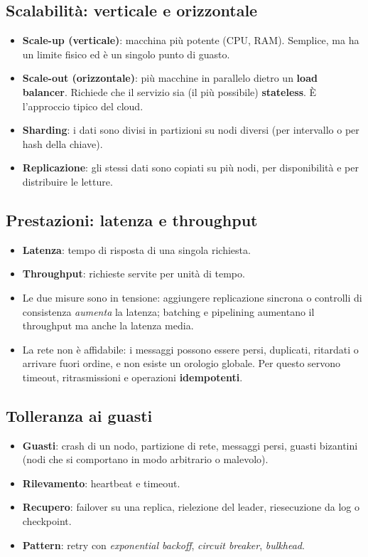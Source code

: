 \subsection{Scalabilità: verticale e orizzontale}
\begin{itemize}
    \item \textbf{Scale-up (verticale)}: macchina più potente (CPU, RAM). Semplice, ma ha un limite fisico ed è un singolo punto di guasto.
    \item \textbf{Scale-out (orizzontale)}: più macchine in parallelo dietro un \textbf{load balancer}. Richiede che il servizio sia (il più possibile) \textbf{stateless}. È l'approccio tipico del cloud.
    \item \textbf{Sharding}: i dati sono divisi in partizioni su nodi diversi (per intervallo o per hash della chiave).
    \item \textbf{Replicazione}: gli stessi dati sono copiati su più nodi, per disponibilità e per distribuire le letture.
\end{itemize}

\subsection{Prestazioni: latenza e throughput}
\begin{itemize}
    \item \textbf{Latenza}: tempo di risposta di una singola richiesta.
    \item \textbf{Throughput}: richieste servite per unità di tempo.
    \item Le due misure sono in tensione: aggiungere replicazione sincrona o controlli di consistenza \emph{aumenta} la latenza; batching e pipelining aumentano il throughput ma anche la latenza media.
    \item La rete non è affidabile: i messaggi possono essere persi, duplicati, ritardati o arrivare fuori ordine, e non esiste un orologio globale. Per questo servono timeout, ritrasmissioni e operazioni \textbf{idempotenti}.
\end{itemize}

\subsection{Tolleranza ai guasti}
\begin{itemize}
    \item \textbf{Guasti}: crash di un nodo, partizione di rete, messaggi persi, guasti bizantini (nodi che si comportano in modo arbitrario o malevolo).
    \item \textbf{Rilevamento}: heartbeat e timeout.
    \item \textbf{Recupero}: failover su una replica, rielezione del leader, riesecuzione da log o checkpoint.
    \item \textbf{Pattern}: retry con \emph{exponential backoff}, \emph{circuit breaker}, \emph{bulkhead}.
\end{itemize}

